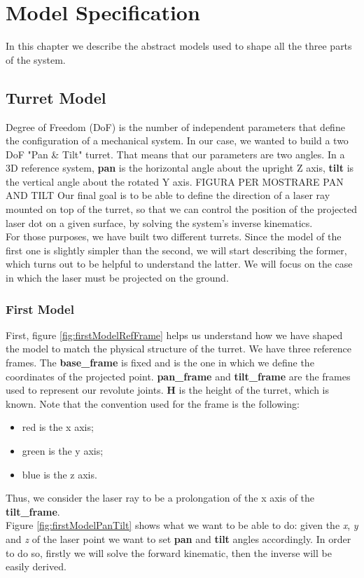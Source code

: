 \chapter{Model Specification}
\label{chap:1} 
In this chapter we describe the abstract models used to shape all the three parts of the system.
\section{Turret Model}
Degree of Freedom (DoF) is the number of independent parameters that define the configuration of a mechanical system. In our case, we wanted to build a two DoF "Pan \& Tilt" turret. That means that our parameters are two angles. In a 3D reference system, \textbf{pan} is the horizontal angle about the upright Z axis, \textbf{tilt} is the vertical angle about the rotated Y axis. FIGURA PER MOSTRARE PAN AND TILT
Our final goal is to be able to define the direction of a laser ray mounted on top of the turret, so that we can control the position of the projected laser dot on a given surface, by solving the system's inverse kinematics.\\

For those purposes, we have built two different turrets. Since the model of the first one is slightly simpler than the second, we will start describing the former, which turns out to be helpful to understand the latter. We will focus on the case in which the laser must be projected on the ground.

\subsection{First Model}
First, figure \ref{fig:firstModelRefFrame} helps us understand how we have shaped the model to match the physical structure of the turret. We have three reference frames. The \textbf{base\_frame} is fixed and is the one in which we define the coordinates of the projected point. \textbf{pan\_frame} and \textbf{tilt\_frame} are the frames used to represent our revolute joints.
\textbf{H} is the height of the turret, which is known. Note that the convention used for the frame is the following:
\begin{itemize}
    \item red is the x axis;
    \item green is the y axis;
    \item blue is the z axis.
\end{itemize}
Thus, we consider the laser ray to be a prolongation of the x axis of the \textbf{tilt\_frame}. \\
Figure \ref{fig:firstModelPanTilt} shows what we want to be able to do: given the \textit{x}, \textit{y} and \textit{z} of the laser point we want to set \textbf{pan} and \textbf{tilt} angles accordingly. In order to do so, firstly we will solve the forward kinematic, then the inverse will be easily derived.
